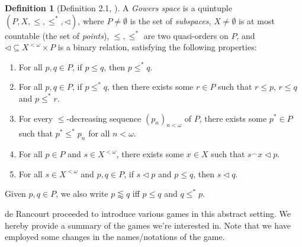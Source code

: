 \documentclass[11pt,reqno]{amsart}
\theoremstyle{plain}
\numberwithin{equation}{section}
\theoremstyle{definition}
\newtheorem{definition}[theorem]{Definition}
\begin{document}
\begin{definition}[Definition 2.1, \cite{d20}]
\label{def:gowers.space}
    A \emph{Gowers space} is a quintuple $(P,X,\leq,\leq^*,\lhd)$, where $P \neq \emptyset$ is the set of \emph{subspaces}, $X \neq \emptyset$ is at most countable (the set of \emph{points}), $\leq,\leq^*$ are two quasi-orders on $P$, and $\lhd \subseteq X^{<\omega} \times P$ is a binary relation, satisfying the following properties:
    \begin{enumerate}
        \item For all $p,q \in P$, if $p \leq q$, then $p \leq^* q$.

        \item For all $p,q \in P$, if $p \leq^* q$, then there exists some $r \in P$ such that $r \leq p$, $r \leq q$ and $p \leq^* r$.

        \item For every $\leq$-decreasing sequence $(p_n)_{n<\omega}$ of $P$, there exists some $p^* \in P$ such that $p^* \leq^* p_n$ for all $n < \omega$.

        \item For all $p \in P$ and $s \in X^{<\omega}$, there exists some $x \in X$ such that $s^\frown x \lhd p$.

        \item For all $s \in X^{<\omega}$ and $p,q \in P$, if $s \lhd p$ and $p \leq q$, then $s \lhd q$.
    \end{enumerate}
    Given $p,q \in P$, we also write $p \lessapprox q$ iff $p \leq q$ and $q \leq^* p$.
\end{definition}

de Rancourt proceeded to introduce various games in this abstract setting. We hereby provide a summary of the games we're interested in. Note that we have employed some changes in the names/notations of the game.
\end{document}
